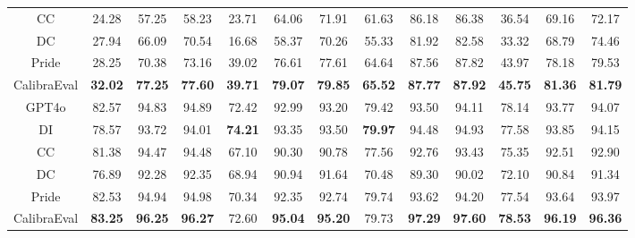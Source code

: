 \documentclass[sigconf]{acmart}
\begin{document}
\begin{table}[]
\begin{tabular}{c|ccc|ccc|ccc|ccc}
CC                     & 24.28          & 57.25          & 58.23          & 23.71          & 64.06          & 71.91          & 61.63          & 86.18          & 86.38          & 36.54          & 69.16          & 72.17          \\
DC                     & 27.94          & 66.09          & 70.54          & 16.68          & 58.37          & 70.26          & 55.33          & 81.92          & 82.58          & 33.32          & 68.79          & 74.46          \\
Pride                  & 28.25          & 70.38          & 73.16          & 39.02          & 76.61          & 77.61          & 64.64          & 87.56          & 87.82          & 43.97          & 78.18          & 79.53          \\
CalibraEval            & \textbf{32.02} & \textbf{77.25} & \textbf{77.60} & \textbf{39.71} & \textbf{79.07} & \textbf{79.85} & \textbf{65.52} & \textbf{87.77} & \textbf{87.92} & \textbf{45.75} & \textbf{81.36} & \textbf{81.79} \\ \hline
GPT4o                  & 82.57          & 94.83          & 94.89          & 72.42          & 92.99          & 93.20          & 79.42          & 93.50          & 94.11          & 78.14          & 93.77          & 94.07          \\
DI                     & 78.57          & 93.72          & 94.01          & \textbf{74.21}          & 93.35          & 93.50          & \textbf{79.97}          & 94.48          & 94.93          & 77.58          & 93.85          & 94.15          \\
CC                     & 81.38          & 94.47          & 94.48          & 67.10          & 90.30          & 90.78          & 77.56          & 92.76          & 93.43          & 75.35          & 92.51          & 92.90          \\
DC                     & 76.89          & 92.28          & 92.35          & 68.94          & 90.94          & 91.64          & 70.48          & 89.30          & 90.02          & 72.10          & 90.84          & 91.34          \\
Pride                  & 82.53          & 94.94          & 94.98          & 70.34          & 92.35          & 92.74          & 79.74          & 93.62          & 94.20          & 77.54          & 93.64          & 93.97          \\
CalibraEval            & \textbf{83.25} & \textbf{96.25} & \textbf{96.27} & 72.60 & \textbf{95.04} & \textbf{95.20} & 79.73 & \textbf{97.29} & \textbf{97.60} & \textbf{78.53} & \textbf{96.19} & \textbf{96.36} \\ \hline
\end{tabular}

\label{main}
\end{table}
\end{document}
